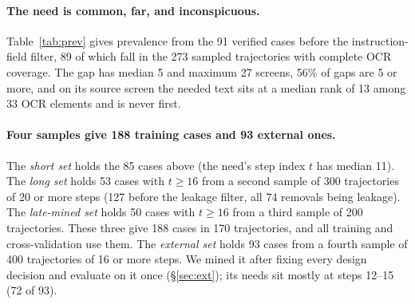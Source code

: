 \paragraph{The need is common, far, and inconspicuous.} Table~\ref{tab:prev} gives prevalence from the 91 verified cases before the instruction-field filter, 89 of which fall in the 273 sampled trajectories with complete OCR coverage. The gap has median 5 and maximum 27 screens, 56\% of gaps are 5 or more, and on its source screen the needed text sits at a median rank of 13 among 33 OCR elements and is never first.

\paragraph{Four samples give 188 training cases and 93 external ones.} The \emph{short set} holds the 85 cases above (the need's step index $t$ has median 11). The \emph{long set} holds 53 cases with $t\ge16$ from a second sample of 300 trajectories of 20 or more steps (127 before the leakage filter, all 74 removals being leakage). The \emph{late-mined set} holds 50 cases with $t\ge16$ from a third sample of 200 trajectories. These three give 188 cases in 170 trajectories, and all training and cross-validation use them. The \emph{external set} holds 93 cases from a fourth sample of 400 trajectories of 16 or more steps. We mined it after fixing every design decision and evaluate on it once (\S\ref{sec:ext}); its needs sit mostly at steps 12--15 (72 of 93).
